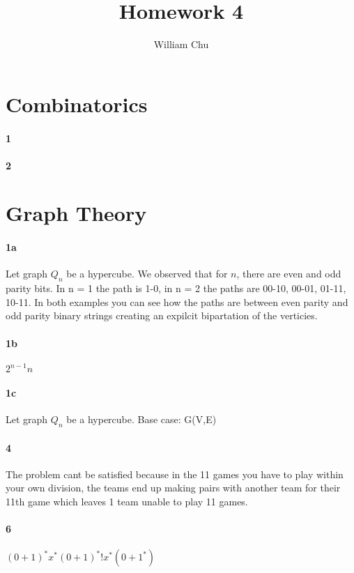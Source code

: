 \documentclass{article}
\begin{document}
 
\title{Homework 4} 
\author{William Chu}  
\maketitle

\section{Combinatorics}
\paragraph{1}
\paragraph{2}

\section{Graph Theory}
\paragraph{1a} Let graph $Q_n$ be a hypercube. We observed that for $n$, there are even and odd parity bits. In n = 1 the path is 1-0, in n = 2 the paths are 00-10, 00-01, 01-11, 10-11. In both examples you can see how the paths are between even parity and odd parity binary strings creating an expilcit bipartation of the verticies.
\paragraph{1b} $2^{n-1}n$
\paragraph{1c}Let graph $Q_n$ be a hypercube. Base case: G(V,E)

\paragraph{4}The problem cant be satisfied because in the 11 games you have to play within your own division, the teams end up making pairs with another team for their 11th game which leaves 1 team unable to play 11 games.

\paragraph{6}$(0+1)^*x^*(0+1)^*$!$x^*(0+1^*)$
\end{document}
